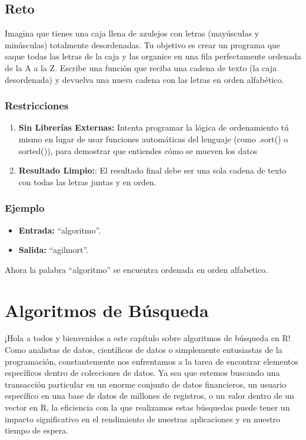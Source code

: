\documentclass[
  spanish,
  letterpaper,
  DIV=11,
  numbers=noendperiod]{scrreprt}
\providecommand{\tightlist}{%
  \setlength{\itemsep}{0pt}\setlength{\parskip}{0pt}}
\begin{document}
\section{Reto}\label{reto}

Imagina que tienes una caja llena de azulejos con letras (mayúsculas y
minúsculas) totalmente desordenadas. Tu objetivo es crear un programa
que saque todas las letras de la caja y las organice en una fila
perfectamente ordenada de la A a la Z. Escribe una función que reciba
una cadena de texto (la caja desordenada) y devuelva una nueva cadena
con las letras en orden alfabético.

\subsection{Restricciones}\label{restricciones}

\begin{enumerate}
\def\labelenumi{\arabic{enumi}.}
\setcounter{enumi}{1}
\tightlist
\item
  \textbf{Sin Librerías Externas:} Intenta programar la lógica de
  ordenamiento tú mismo en lugar de usar funciones automáticas del
  lenguaje (como .sort() o sorted()), para demostrar que entiendes cómo
  se mueven los datos
\item
  \textbf{Resultado Limpio:}: El resultado final debe ser una sola
  cadena de texto con todas las letras juntas y en orden.
\end{enumerate}

\subsection{Ejemplo}\label{ejemplo-8}

\begin{itemize}
\tightlist
\item
  \textbf{Entrada:} ``algoritmo''.
\item
  \textbf{Salida:} ``agilmort''.
\end{itemize}

Ahora la palabra ``algoritmo'' se encuentra ordenada en orden
alfabetico.


\chapter{Algoritmos de Búsqueda}\label{algoritmos-de-buxfasqueda}

¡Hola a todos y bienvenidos a este capítulo sobre algoritmos de búsqueda
en R! Como analistas de datos, científicos de datos o simplemente
entusiastas de la programación, constantemente nos enfrentamos a la
tarea de encontrar elementos específicos dentro de colecciones de datos.
Ya sea que estemos buscando una transacción particular en un enorme
conjunto de datos financieros, un usuario específico en una base de
datos de millones de registros, o un valor dentro de un vector en R, la
eficiencia con la que realizamos estas búsquedas puede tener un impacto
significativo en el rendimiento de nuestras aplicaciones y en nuestro
tiempo de espera.
\end{document}
